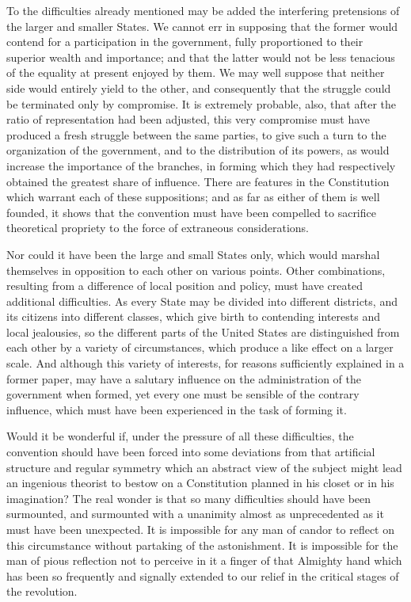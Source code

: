 To the difficulties already mentioned may be added the interfering pretensions of the larger and smaller States. 
We cannot err in supposing that the former would contend for a participation in the government, fully proportioned to their superior wealth and importance; and that the latter would not be less tenacious of the equality at present enjoyed by them. 
We may well suppose that neither side would entirely yield to the other, and consequently that the struggle could be terminated only by compromise. 
It is extremely probable, also, that after the ratio of representation had been adjusted, this very compromise must have produced a fresh struggle between the same parties, to give such a turn to the organization of the government, and to the distribution of its powers, as would increase the importance of the branches, in forming which they had respectively obtained the greatest share of influence. 
There are features in the Constitution which warrant each of these suppositions; and as far as either of them is well founded, it shows that the convention must have been compelled to sacrifice theoretical propriety to the force of extraneous considerations.

Nor could it have been the large and small States only, which would marshal themselves in opposition to each other on various points. 
Other combinations, resulting from a difference of local position and policy, must have created additional difficulties. 
As every State may be divided into different districts, and its citizens into different classes, which give birth to contending interests and local jealousies, so the different parts of the United States are distinguished from each other by a variety of circumstances, which produce a like effect on a larger scale. 
And although this variety of interests, for reasons sufficiently explained in a former paper, may have a salutary influence on the administration of the government when formed, yet every one must be sensible of the contrary influence, which must have been experienced in the task of forming it.

Would it be wonderful if, under the pressure of all these difficulties, the convention should have been forced into some deviations from that artificial structure and regular symmetry which an abstract view of the subject might lead an ingenious theorist to bestow on a Constitution planned in his closet or in his imagination? 
The real wonder is that so many difficulties should have been surmounted, and surmounted with a unanimity almost as unprecedented as it must have been unexpected. 
It is impossible for any man of candor to reflect on this circumstance without partaking of the astonishment. 
It is impossible for the man of pious reflection not to perceive in it a finger of that Almighty hand which has been so frequently and signally extended to our relief in the critical stages of the revolution.

